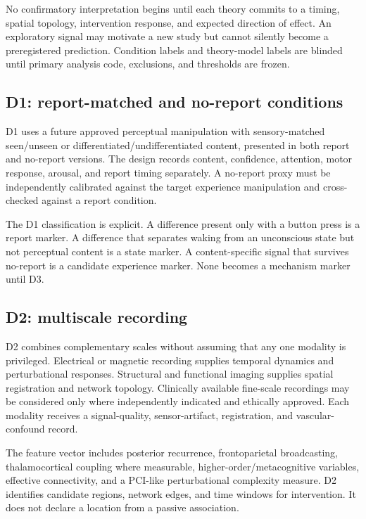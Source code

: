 \documentclass[conference]{IEEEtran}
\begin{document}
No confirmatory interpretation begins until each theory commits to a timing, spatial topology, intervention response, and expected direction of effect. An exploratory signal may motivate a new study but cannot silently become a preregistered prediction. Condition labels and theory-model labels are blinded until primary analysis code, exclusions, and thresholds are frozen.

\subsection{D1: report-matched and no-report conditions}

D1 uses a future approved perceptual manipulation with sensory-matched seen/unseen or differentiated/undifferentiated content, presented in both report and no-report versions. The design records content, confidence, attention, motor response, arousal, and report timing separately. A no-report proxy must be independently calibrated against the target experience manipulation and cross-checked against a report condition.

The D1 classification is explicit. A difference present only with a button press is a report marker. A difference that separates waking from an unconscious state but not perceptual content is a state marker. A content-specific signal that survives no-report is a candidate experience marker. None becomes a mechanism marker until D3.

\subsection{D2: multiscale recording}

D2 combines complementary scales without assuming that any one modality is privileged. Electrical or magnetic recording supplies temporal dynamics and perturbational responses. Structural and functional imaging supplies spatial registration and network topology. Clinically available fine-scale recordings may be considered only where independently indicated and ethically approved. Each modality receives a signal-quality, sensor-artifact, registration, and vascular-confound record.

The feature vector includes posterior recurrence, frontoparietal broadcasting, thalamocortical coupling where measurable, higher-order/metacognitive variables, effective connectivity, and a PCI-like perturbational complexity measure. D2 identifies candidate regions, network edges, and time windows for intervention. It does not declare a location from a passive association.
\end{document}
